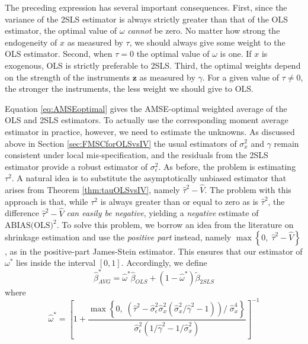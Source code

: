 \documentclass[12pt]{article}
\theoremstyle{definition}
\begin{document}
The preceding expression has several important consequences. 
First, since the variance of the 2SLS estimator is always strictly greater than that of the OLS estimator, the optimal value of $\omega$ \emph{cannot} be zero. 
No matter how strong the endogeneity of $x$ as measured by $\tau$, we should always give some weight to the OLS estimator. 
Second, when $\tau = 0$ the optimal value of $\omega$ is one. If $x$ is exogenous, OLS is strictly preferable to 2SLS. 
Third, the optimal weights depend on the strength of the instruments $\mathbf{z}$ as measured by $\gamma$. 
For a given value of $\tau\neq 0$, the stronger the instruments, the less weight we should give to OLS.

Equation \ref{eq:AMSEoptimal} gives the AMSE-optimal weighted average of the OLS and 2SLS estimators. 
To actually use the corresponding moment average estimator in practice, however, we need to estimate the unknowns.
As discussed above in Section \ref{sec:FMSCforOLSvsIV} the usual estimators of $\sigma_x^2$ and $\gamma$ remain consistent under local mis-specification, and the residuals from the 2SLS estimator provide a robust estimator of $\sigma_\epsilon^2$.
As before, the problem is estimating $\tau^2$.
A natural idea is to substitute the asymptotically unbiased estimator that arises from Theorem \ref{thm:tauOLSvsIV}, namely $\widehat{\tau}^2 - \widehat{V}$. 
The problem with this approach is that, while $\tau^2$ is always greater than or equal to zero as is $\widehat{\tau}^2$, the difference $\widehat{\tau}^2 - \widehat{V}$ \emph{can easily be negative}, yielding a \emph{negative} estimate of $\mbox{ABIAS(OLS)}^2$.
To solve this problem, we borrow an idea from the literature on shrinkage estimation and use the \emph{positive part} instead, namely $\max\left\{0, \; \widehat{\tau}^2 - \widehat{V}\right\}$, as in the positive-part James-Stein estimator.
This ensures that our estimator of $\omega^*$ lies inside the interval $[0,1]$.
Accordingly, we define 
\begin{equation}
	\widehat{\beta}^*_{AVG} = \widehat{\omega}^* \widehat{\beta}_{OLS} + (1 - \widehat{\omega}^*)\widetilde{\beta}_{2SLS}
\end{equation}
where
\begin{equation}
\widehat{\omega }^* = \left[1 + \frac{\max \left\{0, \; \left(\widehat{\tau}^2 - \widehat{\sigma}_\epsilon^2\widehat{\sigma}_x^2  \left(\widehat{\sigma}_x^2/\widehat{\gamma}^2 - 1 \right) \right)/\;\widehat{\sigma}_x^4 \right\}}{\widehat{\sigma}_\epsilon^2 (1/\widehat{\gamma}^2 - 1/\widehat{\sigma}_x^2)}\right]^{-1}
\end{equation}
 
\end{document}
